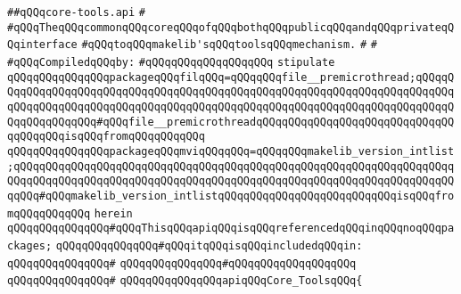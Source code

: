 \label{src/app/makelib/tools/main/core-tools.api}
\verb|##qQQqcore-tools.api|\newline
\verb|#|\newline
\verb|#qQQqTheqQQqcommonqQQqcoreqQQqofqQQqbothqQQqpublicqQQqandqQQqprivateqQQqinterface|\newline
\verb|#qQQqtoqQQqmakelib'sqQQqtoolsqQQqmechanism.|\newline
\verb|#|\newline
\verb|#|\newline
\newline
\verb|#qQQqCompiledqQQqby:|\newline
\verb|#qQQqqQQqqQQqqQQqqQQq|\newline
\newline
\verb|stipulate|\newline
\verb|qQQqqQQqqQQqqQQqpackageqQQqfilqQQq=qQQqqQQqfile__premicrothread;qQQqqQQqqQQqqQQqqQQqqQQqqQQqqQQqqQQqqQQqqQQqqQQqqQQqqQQqqQQqqQQqqQQqqQQqqQQqqQQqqQQqqQQqqQQqqQQqqQQqqQQqqQQqqQQqqQQqqQQqqQQqqQQqqQQqqQQqqQQqqQQqqQQqqQQqqQQqqQQq#qQQqfile__premicrothreadqQQqqQQqqQQqqQQqqQQqqQQqqQQqqQQqqQQqqQQqisqQQqfromqQQqqQQqqQQq|\newline
\verb|qQQqqQQqqQQqqQQqpackageqQQqmviqQQqqQQq=qQQqqQQqmakelib_version_intlist;qQQqqQQqqQQqqQQqqQQqqQQqqQQqqQQqqQQqqQQqqQQqqQQqqQQqqQQqqQQqqQQqqQQqqQQqqQQqqQQqqQQqqQQqqQQqqQQqqQQqqQQqqQQqqQQqqQQqqQQqqQQqqQQqqQQqqQQqqQQqqQQq#qQQqmakelib_version_intlistqQQqqQQqqQQqqQQqqQQqqQQqqQQqisqQQqfromqQQqqQQqqQQq|\newline
\verb|herein|\newline
\newline
\verb|qQQqqQQqqQQqqQQq#qQQqThisqQQqapiqQQqisqQQqreferencedqQQqinqQQqnoqQQqpackages;|\newline
\verb|qQQqqQQqqQQqqQQq#qQQqitqQQqisqQQqincludedqQQqin:|\newline
\verb|qQQqqQQqqQQqqQQq#|\newline
\verb|qQQqqQQqqQQqqQQq#qQQqqQQqqQQqqQQqqQQq|\newline
\verb|qQQqqQQqqQQqqQQq#|\newline
\verb|qQQqqQQqqQQqqQQqapiqQQqCore_ToolsqQQq{|\newline
